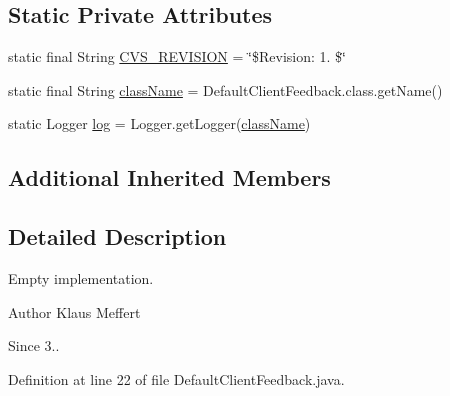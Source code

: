\subsection*{Static Private Attributes}
\begin{DoxyCompactItemize}
\item 
static final String \hyperlink{classorg_1_1jgap_1_1distr_1_1grid_1_1_default_client_feedback_af55832416d54f1994b28789bd1301a02}{C\-V\-S\-\_\-\-R\-E\-V\-I\-S\-I\-O\-N} = \char`\"{}\$Revision\-: 1. \$\char`\"{}
\item 
static final String \hyperlink{classorg_1_1jgap_1_1distr_1_1grid_1_1_default_client_feedback_a11014e591bed3d694db329fd7212410d}{class\-Name} = Default\-Client\-Feedback.\-class.\-get\-Name()
\item 
static Logger \hyperlink{classorg_1_1jgap_1_1distr_1_1grid_1_1_default_client_feedback_ad788aec5ce0e5a98a866894dd44208f4}{log} = Logger.\-get\-Logger(\hyperlink{classorg_1_1jgap_1_1distr_1_1grid_1_1_default_client_feedback_a11014e591bed3d694db329fd7212410d}{class\-Name})
\end{DoxyCompactItemize}
\subsection*{Additional Inherited Members}


\subsection{Detailed Description}
Empty implementation.

\begin{DoxyAuthor}{Author}
Klaus Meffert 
\end{DoxyAuthor}
\begin{DoxySince}{Since}
3.. 
\end{DoxySince}


Definition at line 22 of file Default\-Client\-Feedback.\-java.




